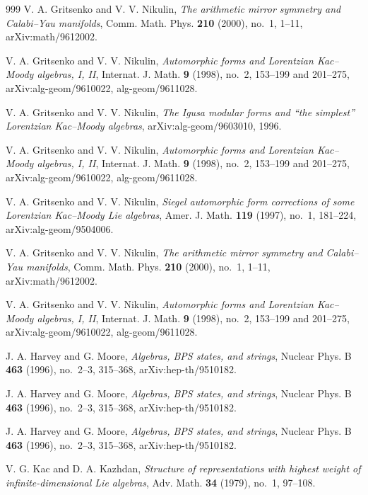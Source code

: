 \begin{thebibliography}{999}
V. A. Gritsenko and V. V. Nikulin, \emph{The arithmetic mirror symmetry and Calabi--Yau manifolds}, Comm. Math. Phys. \textbf{210} (2000), no.~1, 1--11, arXiv:math/9612002.

V. A. Gritsenko and V. V. Nikulin, \emph{Automorphic forms and Lorentzian Kac--Moody algebras, I, II}, Internat. J. Math. \textbf{9} (1998), no.~2, 153--199 and 201--275, arXiv:alg-geom/9610022, alg-geom/9611028.

V. A. Gritsenko and V. V. Nikulin, \emph{The Igusa modular forms and ``the simplest'' Lorentzian Kac--Moody algebras}, arXiv:alg-geom/9603010, 1996.

V. A. Gritsenko and V. V. Nikulin, \emph{Automorphic forms and Lorentzian Kac--Moody algebras, I, II}, Internat. J. Math. \textbf{9} (1998), no.~2, 153--199 and 201--275, arXiv:alg-geom/9610022, alg-geom/9611028.

V. A. Gritsenko and V. V. Nikulin, \emph{Siegel automorphic form corrections of some Lorentzian Kac--Moody Lie algebras}, Amer. J. Math. \textbf{119} (1997), no.~1, 181--224, arXiv:alg-geom/9504006.

V. A. Gritsenko and V. V. Nikulin, \emph{The arithmetic mirror symmetry and Calabi--Yau manifolds}, Comm. Math. Phys. \textbf{210} (2000), no.~1, 1--11, arXiv:math/9612002.

V. A. Gritsenko and V. V. Nikulin, \emph{Automorphic forms and Lorentzian Kac--Moody algebras, I, II}, Internat. J. Math. \textbf{9} (1998), no.~2, 153--199 and 201--275, arXiv:alg-geom/9610022, alg-geom/9611028.

J. A. Harvey and G. Moore, \emph{Algebras, BPS states, and strings}, Nuclear Phys. B \textbf{463} (1996), no.~2--3, 315--368, arXiv:hep-th/9510182.

J. A. Harvey and G. Moore, \emph{Algebras, BPS states, and strings}, Nuclear Phys. B \textbf{463} (1996), no.~2--3, 315--368, arXiv:hep-th/9510182.

J. A. Harvey and G. Moore, \emph{Algebras, BPS states, and strings}, Nuclear Phys. B \textbf{463} (1996), no.~2--3, 315--368, arXiv:hep-th/9510182.

V. G. Kac and D. A. Kazhdan, \emph{Structure of representations with highest weight of infinite-dimensional Lie algebras}, Adv. Math. \textbf{34} (1979), no.~1, 97--108.


\end{thebibliography}
